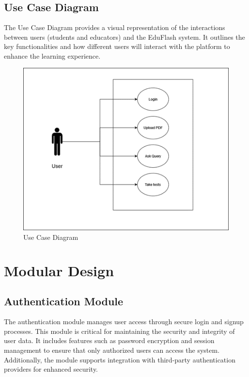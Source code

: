 \documentclass{report}
\begin{document}
\subsection{Use Case Diagram}
\Large
The Use Case Diagram provides a visual representation of the interactions between users (students and educators) and the EduFlash system. It outlines the key functionalities and how different users will interact with the platform to enhance the learning experience. \\
\begin{figure}[h]
    \centering
    \includegraphics[width=\textwidth]{usecasediagram.png}
    \caption{Use Case Diagram}
\end{figure}
\clearpage

\section{Modular Design}

\subsection{Authentication Module}
The authentication module manages user access through secure login and signup processes. This module is critical for maintaining the security and integrity of user data. It includes features such as password encryption and session management to ensure that only authorized users can access the system. Additionally, the module supports integration with third-party authentication providers for enhanced security.
\end{document}
